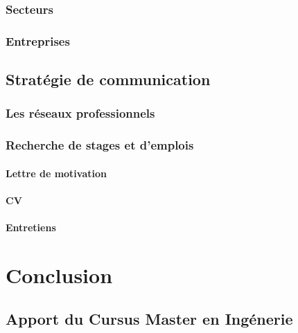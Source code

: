 \documentclass[a4paper,12pt, draft]{report}
\begin{document}
\section{Secteurs}
\section{Entreprises}

\chapter{Stratégie de communication}
\section{Les réseaux professionnels}
\section{Recherche de stages et d'emplois}
\subsection{Lettre de motivation}
\subsection{CV}
\subsection{Entretiens}

\part{Conclusion}
\chapter{Apport du Cursus Master en Ingénerie}


\listoffigures{}

\tableofcontents{}
\end{document}
